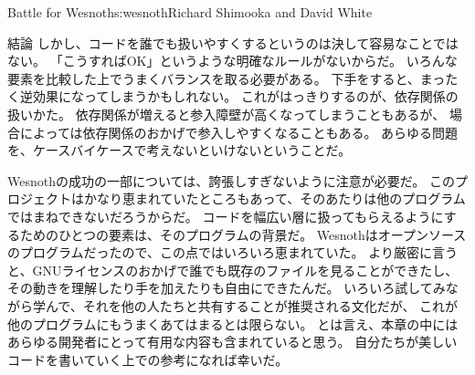 \begin{aosachapter}{Battle for Wesnoth}{s:wesnoth}{Richard Shimooka and David White}
\begin{aosasect1}{結論}
しかし、コードを誰でも扱いやすくするというのは決して容易なことではない。
「こうすればOK」というような明確なルールがないからだ。
いろんな要素を比較した上でうまくバランスを取る必要がある。
下手をすると、まったく逆効果になってしまうかもしれない。
これがはっきりするのが、依存関係の扱いかた。
依存関係が増えると参入障壁が高くなってしまうこともあるが、
場合によっては依存関係のおかげで参入しやすくなることもある。
あらゆる問題を、ケースバイケースで考えないといけないということだ。

Wesnothの成功の一部については、誇張しすぎないように注意が必要だ。
このプロジェクトはかなり恵まれていたところもあって、そのあたりは他のプログラムではまねできないだろうからだ。
コードを幅広い層に扱ってもらえるようにするためのひとつの要素は、そのプログラムの背景だ。
Wesnothはオープンソースのプログラムだったので、この点ではいろいろ恵まれていた。
より厳密に言うと、GNUライセンスのおかげで誰でも既存のファイルを見ることができたし、
その動きを理解したり手を加えたりも自由にできたんだ。
いろいろ試してみながら学んで、それを他の人たちと共有することが推奨される文化だが、
これが他のプログラムにもうまくあてはまるとは限らない。
とは言え、本章の中にはあらゆる開発者にとって有用な内容も含まれていると思う。
自分たちが美しいコードを書いていく上での参考になれば幸いだ。

\end{aosasect1}

\end{aosachapter}

